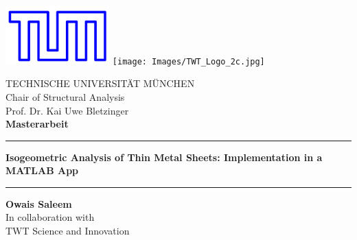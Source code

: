 \documentclass[12pt, a4paper]{report}
\begin{document}

\begin{titlepage}
    \begin{center}
        \vspace*{\fill} 
        \begin{minipage}{\textwidth}
            \centering
            \includegraphics[width=4cm]{Images/TUM LOGO.png} %
            \hspace{2cm}
            \texttt{[image: Images/TWT\_Logo\_2c.jpg]} %
            \vspace*{1cm}
            \begin{minipage}{0.6\textwidth}
                \centering
                \LARGE{TECHNISCHE UNIVERSITÄT MÜNCHEN}\\
                \Large {Chair of Structural Analysis} \\
                \large {Prof. Dr. Kai Uwe Bletzinger}\\
                \vspace{0.5cm}
                \large \textbf{Masterarbeit} \\
                \vspace{0.5cm}
                \vspace{0.2cm}
                \hrule %
                \vspace{0.2cm}
                \Huge \textbf{\textcolor{navyblue}{Isogeometric Analysis of Thin Metal Sheets: Implementation in a MATLAB App}} \\
                \vspace{0.2cm}
                \hrule %
                \vspace{0.5cm}
                \large \textbf{\textcolor{navyblue}{Owais Saleem}} \\
                \normalsize In collaboration with \\
                \Large{TWT Science and Innovation} \\
                \vspace*{2cm}
            \end{minipage}
        \end{minipage}
    \end{center}


\end{titlepage}
\end{document}

